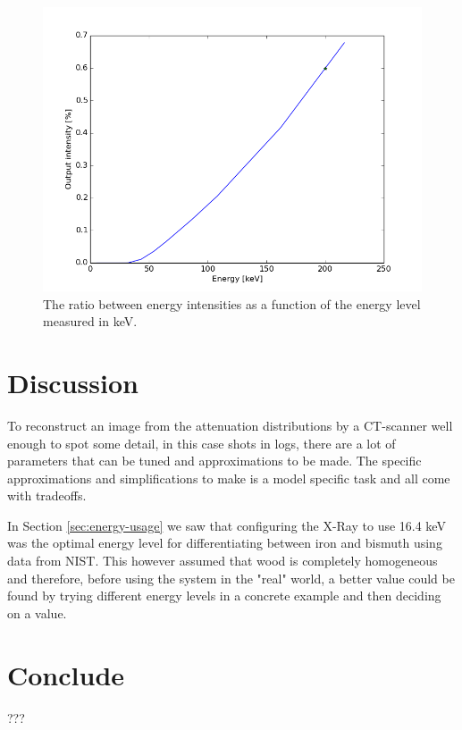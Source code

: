\documentclass{article}
\begin{document}
\begin{figure}[H]
    \centering
    \includegraphics[scale=0.35]{images/energy-vs-output-percentage.png}
    \caption{The ratio between energy intensities as a function of the energy level measured in keV.}
    \label{fig:energy-vs-output-percentage}
\end{figure}

\section{Discussion}
To reconstruct an image from the attenuation distributions by a CT-scanner well enough to spot some detail, in this case shots in logs, there are a lot of parameters that can be tuned and approximations to be made. The specific approximations and simplifications to make is a model specific task and all come with tradeoffs. 

In Section \ref{sec:energy-usage} we saw that configuring the X-Ray to use 16.4 keV was the optimal energy level for differentiating between iron and bismuth using data from NIST. This however assumed that wood is completely homogeneous and therefore, before using the system in the "real" world, a better value could be found by trying different energy levels in a concrete example and then deciding on a value.

\section{Conclude}
???
\end{document}
